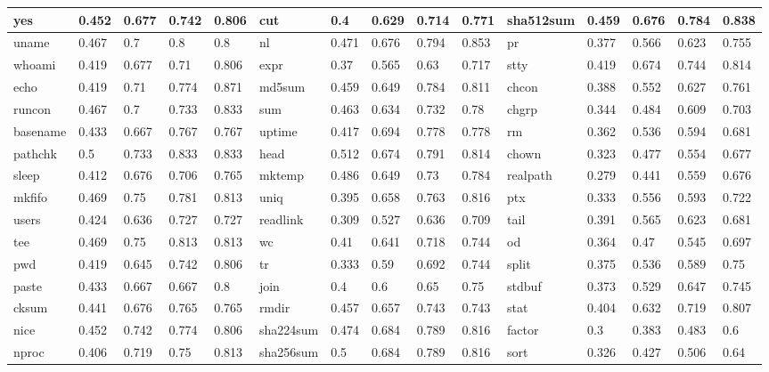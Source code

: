 \begin{table*}[h!]
\begin{center}
\begin{tabular}{ | l | l | l | l | l | l | l | l | l | l | l | l | l | l | l | }
	yes & 0.452 & 0.677 & 0.742 & 0.806 & cut & 0.4 & 0.629 & 0.714 & 0.771 & sha512sum & 0.459 & 0.676 & 0.784 & 0.838 \\ \hline
	uname & 0.467 & 0.7 & 0.8 & 0.8 & nl & 0.471 & 0.676 & 0.794 & 0.853 & pr & 0.377 & 0.566 & 0.623 & 0.755 \\ \hline
	whoami & 0.419 & 0.677 & 0.71 & 0.806 & expr & 0.37 & 0.565 & 0.63 & 0.717 & stty & 0.419 & 0.674 & 0.744 & 0.814 \\ \hline
	echo & 0.419 & 0.71 & 0.774 & 0.871 & md5sum & 0.459 & 0.649 & 0.784 & 0.811 & chcon & 0.388 & 0.552 & 0.627 & 0.761 \\ \hline
	runcon & 0.467 & 0.7 & 0.733 & 0.833 & sum & 0.463 & 0.634 & 0.732 & 0.78 & chgrp & 0.344 & 0.484 & 0.609 & 0.703 \\ \hline
	basename & 0.433 & 0.667 & 0.767 & 0.767 & uptime & 0.417 & 0.694 & 0.778 & 0.778 & rm & 0.362 & 0.536 & 0.594 & 0.681 \\ \hline
	pathchk & 0.5 & 0.733 & 0.833 & 0.833 & head & 0.512 & 0.674 & 0.791 & 0.814 & chown & 0.323 & 0.477 & 0.554 & 0.677 \\ \hline
	sleep & 0.412 & 0.676 & 0.706 & 0.765 & mktemp & 0.486 & 0.649 & 0.73 & 0.784 & realpath & 0.279 & 0.441 & 0.559 & 0.676 \\ \hline
	mkfifo & 0.469 & 0.75 & 0.781 & 0.813 & uniq & 0.395 & 0.658 & 0.763 & 0.816 & ptx & 0.333 & 0.556 & 0.593 & 0.722 \\ \hline
	users & 0.424 & 0.636 & 0.727 & 0.727 & readlink & 0.309 & 0.527 & 0.636 & 0.709 & tail & 0.391 & 0.565 & 0.623 & 0.681 \\ \hline
	tee & 0.469 & 0.75 & 0.813 & 0.813 & wc & 0.41 & 0.641 & 0.718 & 0.744 & od & 0.364 & 0.47 & 0.545 & 0.697 \\ \hline
	pwd & 0.419 & 0.645 & 0.742 & 0.806 & tr & 0.333 & 0.59 & 0.692 & 0.744 & split & 0.375 & 0.536 & 0.589 & 0.75 \\ \hline
	paste & 0.433 & 0.667 & 0.667 & 0.8 & join & 0.4 & 0.6 & 0.65 & 0.75 & stdbuf & 0.373 & 0.529 & 0.647 & 0.745 \\ \hline
	cksum & 0.441 & 0.676 & 0.765 & 0.765 & rmdir & 0.457 & 0.657 & 0.743 & 0.743 & stat & 0.404 & 0.632 & 0.719 & 0.807 \\ \hline
	nice & 0.452 & 0.742 & 0.774 & 0.806 & sha224sum & 0.474 & 0.684 & 0.789 & 0.816 & factor & 0.3 & 0.383 & 0.483 & 0.6 \\ \hline
	nproc & 0.406 & 0.719 & 0.75 & 0.813 & sha256sum & 0.5 & 0.684 & 0.789 & 0.816 & sort & 0.326 & 0.427 & 0.506 & 0.64 \\ \hline

\end{tabular}
\end{center}
\end{table*}
